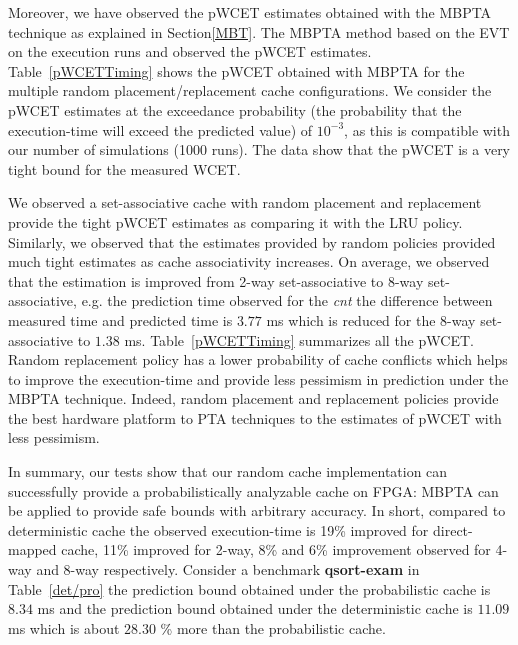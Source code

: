 Moreover, we have observed the pWCET estimates obtained with the MBPTA technique as explained in Section\ref{MBT}. The MBPTA method based on the EVT on the execution runs and observed the pWCET estimates. 
Table~\ref{pWCETTiming} shows the  pWCET obtained with MBPTA
for the multiple random placement/replacement cache configurations. We
consider the pWCET estimates at the exceedance probability (the
probability that the execution-time will exceed the predicted value)
of $10^{-3}$, as this is compatible with our number of simulations
(1000 runs). The data show that the pWCET is a very tight bound for the
measured WCET. 



We observed a set-associative cache with random placement and replacement provide the tight pWCET estimates as comparing it with the LRU policy. Similarly,  we observed that the estimates provided by random policies provided much tight estimates as cache associativity increases. On average, we observed that the estimation is improved from 2-way set-associative to 8-way set-associative, e.g. the prediction time observed for the \textit{cnt} the difference between measured time and predicted time is $3.77$ ms which is reduced for the 8-way set-associative to $1.38$ ms. Table~\ref{pWCETTiming} summarizes all the \small{p}WCET. Random replacement policy has a lower probability of cache conflicts which helps to improve the execution-time and provide less pessimism in prediction under the MBPTA technique. Indeed, random placement and replacement policies provide the best hardware platform to PTA techniques to the estimates of pWCET with less pessimism.




In summary, our tests show that our random cache implementation can 
successfully provide a probabilistically analyzable cache on FPGA:  MBPTA
can be applied to provide safe bounds with arbitrary accuracy. In short, compared to deterministic cache the observed execution-time is 19\% improved
 for direct-mapped cache, 11\% improved for 2-way, 8\% and 6\%
 improvement observed for 4-way and 8-way respectively. Consider a benchmark \textbf{qsort-exam} in Table~\ref{det/pro} the prediction bound obtained under the probabilistic cache is $8.34$ ms and the prediction bound obtained under the deterministic cache is $11.09$ ms which is about $28.30$ \% more than the probabilistic cache.
 
 
 
 
 
 
 
